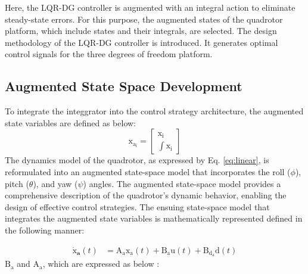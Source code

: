 \documentclass[3p,times]{elsarticle}
\begin{document}
\noindent Here, the LQR-DG controller is augmented with an integral action to eliminate steady-state errors. For this purpose, the augmented states of the quadrotor platform, which include states and their integrals, are selected. The design methodology of the LQR-DG controller is introduced. It generates optimal control signals for the three degrees of freedom platform.

\subsection{Augmented State Space Development}
\noindent To integrate the integgrator into the control strategy architecture, the augmented state variables are defined as below:
\begin{equation}\label{lqidg_x}
    \boldsymbol{\mathrm{x_{a_i}}} = \begin{bmatrix}
        \boldsymbol{\mathrm{x_i}} \\[1em]
        \displaystyle\int\boldsymbol{\mathrm{x_i}}
    \end{bmatrix}
\end{equation}
The dynamics model of the quadrotor, as expressed by Eq. \eqref{eq:linear}, is reformulated into an augmented state-space model that incorporates the roll ($\phi$), pitch ($\theta$), and yaw ($\psi$) angles. The augmented state-space model provides a comprehensive description of the quadrotor's dynamic behavior, enabling the design of effective control strategies. The ensuing state-space model that integrates the augmented state variables is mathematically represented defined in the following manner:

\begin{equation}\label{systemlqidg}
	\begin{split}
		\boldsymbol{\dot{\mathrm{x}}_a}(t) &= \boldsymbol{\mathrm{A_ax_a}}(t) + \boldsymbol{\mathrm{B_{{a}}u}}(t) + \boldsymbol{\mathrm{B_{{d_a}}d}}(t)%
	\end{split}
\end{equation}
$\boldsymbol{\mathrm{B_a}}$ and $\boldsymbol{\mathrm{A_a}}$, which are expressed as below  :
\end{document}
